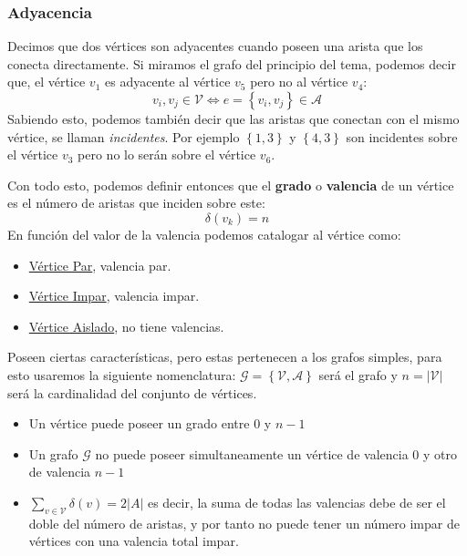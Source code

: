 \subsubsection{Adyacencia}
Decimos que dos vértices son adyacentes cuando poseen una arista que los conecta directamente. Si miramos el grafo del principio del tema, podemos decir que, el vértice \(v_1\) es adyacente al vértice \(v_5\) pero no al vértice \(v_4\):
\[
        v_i, v_j \in \mathcal{V} \Leftrightarrow e = \left\{v_i,v_j\right\} \in \mathcal{A}
\]
Sabiendo esto, podemos también decir que las aristas que conectan con el mismo vértice, se llaman \textit{incidentes}. Por ejemplo \(\left\{1,3\right\} \) y \(\left\{4,3\right\} \) son incidentes sobre el vértice \(v_3\) pero no lo serán sobre el vértice \(v_6\).
\par Con todo esto, podemos definir entonces que el \textbf{grado} o \textbf{valencia} de un vértice  es el número de aristas que inciden sobre este:
\[
        \delta(v_k) = n
\]
En función del valor de la valencia podemos catalogar al vértice como:
\begin{itemize}
        \item \underline{Vértice Par}, valencia par.
        \item \underline{Vértice Impar}, valencia impar.
        \item \underline{Vértice Aislado}, no tiene valencias.
\end{itemize}
Poseen ciertas características, pero estas pertenecen a los grafos simples, para esto usaremos la siguiente nomenclatura: \(\mathcal{G} = \left\{\mathcal{V},\mathcal{A}\right\}\) será el grafo y \(n = \left\lvert \mathcal{V}\right\rvert \) será la cardinalidad del conjunto de vértices.
\begin{itemize}
        \item Un vértice puede poseer un grado entre 0 y \(n-1\)
        \item Un grafo \(\mathcal{G}\) no puede poseer simultaneamente un vértice de valencia 0 y otro de valencia \(n-1\)
        \item \(\sum_{v \in \mathcal{V}} \delta(v) = 2 \left\lvert A\right\rvert \) es decir, la suma de todas las valencias debe de ser el doble del número de aristas, y por tanto no puede tener un número impar de vértices con una valencia total impar.
\end{itemize}

